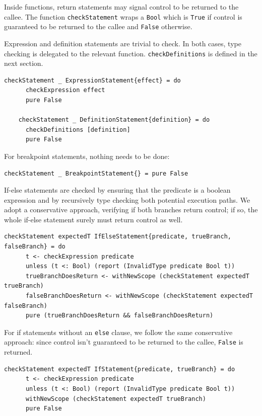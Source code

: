 \documentclass[UdineBachThesis,american,11pt]{PhdThesis}
\begin{document}
  Inside functions, return statements may signal control to be returned to the
  callee. The function \mbox{\texttt{checkStatement}} wraps a
  \mbox{\texttt{Bool}} which is \mbox{\texttt{True}} if control is guaranteed to
  be returned to the callee and \mbox{\texttt{False}} otherwise.

  Expression and definition statements are trivial to check. In both cases, type
  checking is delegated to the relevant function.
  \mbox{\texttt{checkDefinitions}} is defined in the next section.

  \begin{Verbatim}[gobble=4,fontsize=\small]
    checkStatement _ ExpressionStatement{effect} = do
      checkExpression effect
      pure False

    checkStatement _ DefinitionStatement{definition} = do
      checkDefinitions [definition]
      pure False
  \end{Verbatim}

  \pagebreak

  For breakpoint statements, nothing needs to be done:

  \begin{Verbatim}[gobble=4,fontsize=\small]
    checkStatement _ BreakpointStatement{} = pure False
  \end{Verbatim}

  If-else statements are checked by ensuring that the predicate is a boolean
  expression and by recursively type checking both potential execution paths. We
  adopt a conservative approach, verifying if both branches return control; if
  so, the whole if-else statement surely must return control as well.

  \begin{Verbatim}[gobble=4,fontsize=\small]
    checkStatement expectedT IfElseStatement{predicate, trueBranch, falseBranch} = do
      t <- checkExpression predicate
      unless (t <: Bool) (report (InvalidType predicate Bool t))
      trueBranchDoesReturn <- withNewScope (checkStatement expectedT trueBranch)
      falseBranchDoesReturn <- withNewScope (checkStatement expectedT falseBranch)
      pure (trueBranchDoesReturn && falseBranchDoesReturn)
  \end{Verbatim}

  For if statements without an \mbox{\texttt{else}} clause, we follow the same
  conservative approach: since control isn't guaranteed to be returned to the
  callee, \mbox{\texttt{False}} is returned.

  \begin{Verbatim}[gobble=4,fontsize=\small]
    checkStatement expectedT IfStatement{predicate, trueBranch} = do
      t <- checkExpression predicate
      unless (t <: Bool) (report (InvalidType predicate Bool t))
      withNewScope (checkStatement expectedT trueBranch)
      pure False
  \end{Verbatim}
\end{document}
